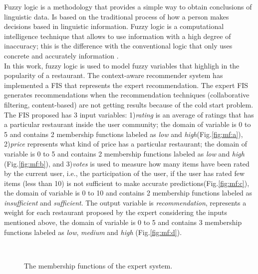 Fuzzy logic is a methodology that provides a simple way to obtain conclusions of
linguistic data. Is based on the traditional process of how a person makes
decisions based in linguistic information.  Fuzzy logic is a computational
intelligence technique that allows to use information with a high degree of
inaccuracy; this is the difference with the conventional logic that only uses
concrete and accurately information \cite{zedeh1989knowledge}.\\  In this work,
fuzzy logic is used to model fuzzy variables that highligh in the popularity of
a restaurant. The context-aware recommender system has implemented a FIS that
represents the expert recommendation. The expert FIS generates recommendations
when the recommendation techniques (collaborative filtering, content-based) are
not getting results because of the cold start problem.\\ The FIS proposed has 3
input variables\cite{garcia2009hybrid}: 1)\textit{rating} is an average of
ratings that has a particular restaurant inside the user community; the domain
of variable is 0 to 5 and contains 2 membership functions labeled as
\textit{low} and \textit{high}(Fig.\ref{fig:mf:a}), 2)\textit{price} represents
what kind of price has a particular restaurant; the domain of variable is 0 to 5
and contains 2 membership functions labeled as \textit{low} and \textit{high}
(Fig.\ref{fig:mf:b}), and 3)\textit{votes} is used to measure how many items
have been rated by the current user, i.e., the participation of the user, if the
user has rated few items (less than 10) is not sufficient to make accurate
predictions(Fig.\ref{fig:mf:c}), the domain of variable is 0 to 10 and contains
2 membership functions labeled as \textit{insufficient} and \textit{sufficient}.
The output variable is \textit{recommendation}, represents a weight for each
restaurant proposed by the expert considering the inputs mentioned above, the
domain of variable is 0 to 5 and contains 3 membership functions labeled as
\textit{low}, \textit{medium} and \textit{high} (Fig.\ref{fig:mf:d}).

\begin{figure}[ht!]
   \centering
   \hspace{0.1\linewidth}
   \\[20pt]
    \hspace{0.1\linewidth}
   \caption{The membership functions of the expert system.
   }
   \label{fig:mfexpert} 
\end{figure}

